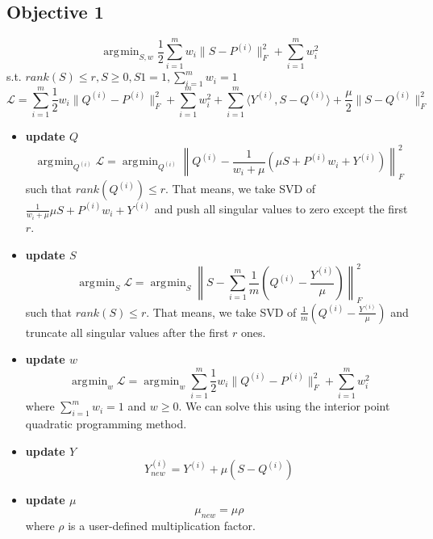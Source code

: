 \documentclass[11pt]{article}
\newcommand{\norm}[1]{\left\lVert#1\right\rVert}
\DeclareMathOperator*{\argmin}{\arg\!\min}
\begin{document}
\subsection*{Objective 1}
\begin{equation}
\argmin_{S, w}\frac{1}{2} \sum_{i=1}^{m}w_i  \|S - P^{(i)}\|_F^2 + \sum_{i=1}^{m} w_i^2
\end{equation}
s.t. $rank(S) \leq r, S \geq 0, S1 = 1, \sum_{i=1}^{m} w_i = 1$
$$\mathcal{L} = \sum_{i=1}^{m} \frac{1}{2} w_i \|Q^{(i)}-P^{(i)}\|_F^2 + \sum_{i=1}^{m} w_i^2+ \sum_{i=1}^{m} \langle Y^{(i)}, S-Q^{(i)} \rangle + \frac{\mu}{2} \|S - Q^{(i)}\|_F^2 $$
\begin{itemize}
\item \textbf{update $Q$}
$$\argmin_{Q^{(i)}}\mathcal{L} =  
\argmin_{Q^{(i)}}\norm{Q^{(i)} - \frac{1}{w_i + \mu}\left( \mu S + P^{(i)}w_i + Y^{(i)}\right)}_F^2$$
such that $rank(Q^{(i)}) \leq r$. That means, we take SVD of $\frac{1}{w_i + \mu}\mu S + P^{(i)}w_i + Y^{(i)}$ and push all singular values to zero except the first $r$. 
\item  \textbf{update $S$}
$$\argmin_S \mathcal{L} = \argmin_S \norm{
S - \sum_{i=1}^{m} \frac{1}{m} \left(Q^{(i)} - \frac{Y^{(i)}}{\mu} \right)
}_F^2$$
such that $rank(S) \leq r$. That means, we take SVD of $\frac{1}{m} \left( Q^{(i)} - \frac{Y^{(i)}}{\mu} \right)$ and truncate all singular values after the first $r$ ones. 
\item  \textbf{update $w$}
$$\argmin_w \mathcal{L} = \argmin_w \sum_{i=1}^{m} \frac{1}{2} w_i \|Q^{(i)} - P^{(i)} \|_F^2 + \sum_{i=1}^{m} w_i^2$$
where $\sum_{i=1}^{m} w_i = 1$ and $w \geq 0$. We can solve this using the interior point quadratic programming method.

\item \textbf{update $Y$}
$$Y^{(i)}_{new} =Y^{(i)} + \mu (S-Q^{(i)})$$
\item \textbf{update $\mu$}
$$\mu_{new} = \mu \rho$$
where $\rho$ is a user-defined multiplication factor.
\end{itemize}
\end{document}
